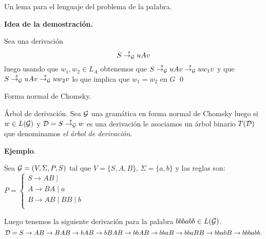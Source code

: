 \documentclass[aspectratio=169, 10pt]{beamer}
\begin{document}
	\begin{frame}[fragile]{Un lema para el lenguaje del problema de la palabra.}

		\textbf{Idea de la demostración.}

		Sea una derivación 
		\[
			S \overset{*}{\to_{\cal G}} uAv
		\]
		luego usando que $w_{1},w_{2} \in L_{A}$ obtenemos que $S \overset{*}{\to_{\cal G}} uAv \overset{*}{\to_{\cal G}} uw_{1}v $ y que $S \overset{*}{\to_{\cal G}} uAv \overset{*}{\to_{\cal G}} uw_{2}v$ lo que implica que $w_{1} = w_{2}$ en $G$
		\qed
	\end{frame}

	\begin{frame}[fragile]{Forma normal de Chomsky.}
		\bigskip 
	\end{frame}

	\begin{frame}[fragile]{Árbol de derivación.}
		Sea ${\cal G}$ una gramática en forma normal de Chomsky luego si $w \in L({\cal G})$ y ${\cal D} = S \overset{*}{\to_{\cal G}} w$ es una derivación le asociamos un árbol binario $T({\cal D})$ que denominamos \emph{el árbol de derivación}.

		\textbf{Ejemplo}.

		Sea ${\cal G} = (V, \Sigma, P, S)$ tal que $V = \{ S,A,B \}$, $\Sigma = \{ a, b\}$ y las reglas son:
		$P = \begin{cases}
								S \to AB \mid   \\
								A \to  BA \mid a	\\
								B \to AB \mid BB \mid b 	\\
		\end{cases}$

		Luego tenemos la siguiente derivación para la palabra $bbbabb \in L({\cal G})$.
		\[
			{\cal D} = S \to AB \to BAB \to bAB \to bBAB \to bbAB \to bbaB \to bbaBB \to bbabB \to bbbabb.
		\]
	\end{frame}
\end{document}
